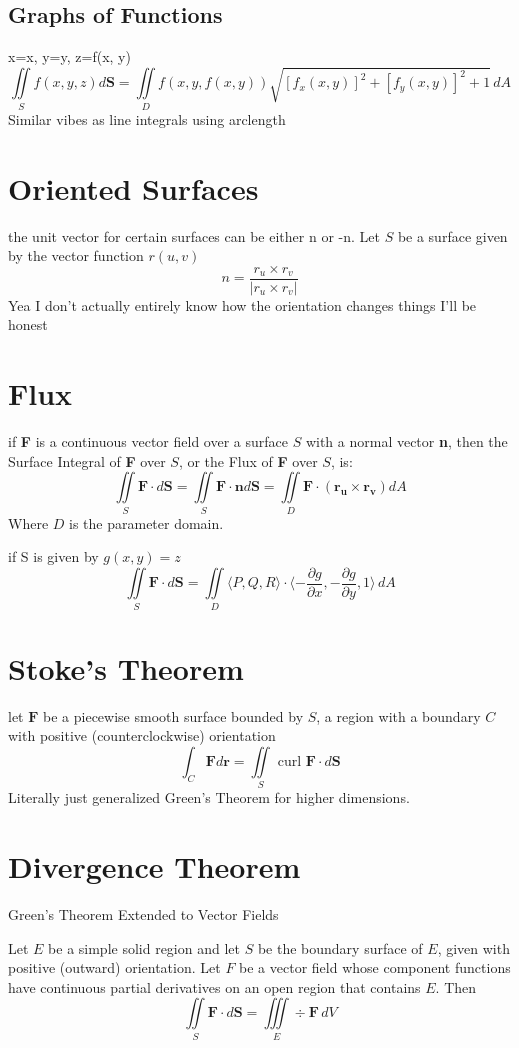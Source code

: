 \documentclass{report}
\newcommand{\pdif}[2]{ \frac{\partial #1}{ \partial #2} }
\begin{document}
\subsection{Graphs of Functions}
x=x, y=y, z=f(x, y)
$$
\iint \limits_S f(x, y, z) d\mathbf{S} = \iint \limits_D f(x, y, f(x, y)) \sqrt{[f_x(x, y)]^2 + [f_y(x, y)]^2 + 1} \,dA
$$
Similar vibes as line integrals using arclength

\section{Oriented Surfaces}
the unit vector for certain surfaces can be either n or -n. 
Let $S$ be a surface given by the vector function $r(u, v)$
$$
n = \frac{r_u \times r_v}{|r_u \times r_v|}
$$
Yea I don't actually entirely know how the orientation changes things I'll be honest

\section{Flux}
if \textbf{F} is a continuous vector field over a surface $S$ with a normal vector \textbf{n}, then the Surface Integral of \textbf{F} over $S$, or the Flux of \textbf{F} over $S$, is:
$$
\iint \limits_S \mathbf{F} \cdot d \mathbf{S} = 
\iint \limits_S \mathbf{F \cdot n} d\mathbf{S} =
\iint \limits_D \mathbf{F \cdot (r_u \times r_v)} dA
$$
Where $D$ is the parameter domain.

if S is given by $g(x, y) = z$
$$
\iint \limits_S \mathbf{F} \cdot d\mathbf{S} = 
\iint \limits_D \langle P, Q, R \rangle \cdot \langle -\pdif{g}{x}, -\pdif{g}{y}, 1 \rangle \,dA
$$

\section{Stoke's Theorem}
let $\mathbf{F}$ be a piecewise smooth surface bounded by $S$, a region with a boundary $C$ with positive (counterclockwise) orientation
$$
\int_C \mathbf{F} d\mathbf{r} = 
\iint \limits_S \text{ curl } \mathbf{F} \cdot d\mathbf{S}
$$
Literally just generalized Green's Theorem for higher dimensions. 

\newpage
\section{Divergence Theorem}
Green's Theorem Extended to Vector Fields

Let $E$ be a simple solid region and let $S$ be the boundary surface of $E$, given with positive (outward) orientation. Let $F$ be a vector field
whose component functions have continuous partial derivatives on an open region
that contains $E$. Then
$$
\iint \limits_S \mathbf{F} \cdot d\mathbf{S} = \iiint \limits_E \div \mathbf{F} \,dV
$$
\end{document}
